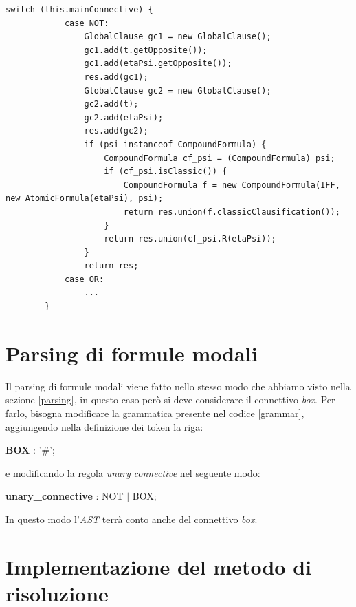 \documentclass[a4paper,12pt]{report}
\begin{document}
\begin{minipage}{\linewidth}
    \small
    \begin{lstlisting}[caption={Parte del metodo \texttt{R} della classe \texttt{CompoundFormula}}, label={R}]
        switch (this.mainConnective) {
            case NOT:
                GlobalClause gc1 = new GlobalClause();
                gc1.add(t.getOpposite());
                gc1.add(etaPsi.getOpposite());
                res.add(gc1);
                GlobalClause gc2 = new GlobalClause();
                gc2.add(t);
                gc2.add(etaPsi);
                res.add(gc2);
                if (psi instanceof CompoundFormula) {
                    CompoundFormula cf_psi = (CompoundFormula) psi;
                    if (cf_psi.isClassic()) {
                        CompoundFormula f = new CompoundFormula(IFF, new AtomicFormula(etaPsi), psi);
                        return res.union(f.classicClausification());
                    }
                    return res.union(cf_psi.R(etaPsi));
                }
                return res;
            case OR:
                ...
        }
    \end{lstlisting}
\end{minipage}

\section*{Parsing di formule modali}
Il parsing di formule modali viene fatto nello stesso modo che abbiamo visto nella sezione \ref{parsing}, in questo caso però si deve considerare il connettivo \emph{box}. Per farlo, bisogna modificare la grammatica presente nel codice \ref{grammar}, aggiungendo nella definizione dei token la riga:
\begin{center}
    \textbf{BOX} : '$\#$';
\end{center}
e modificando la regola \emph{unary$\_$connective} nel seguente modo:
\begin{center}
    \textbf{unary\_connective} : NOT $|$  BOX;
\end{center}
In questo modo l'\emph{AST} terrà conto anche del connettivo \emph{box}.

\section{Implementazione del metodo di risoluzione}
\label{impl_res_modal}
\end{document}
